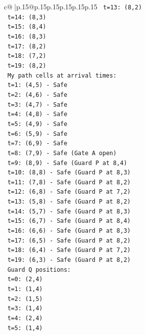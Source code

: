 \documentclass{article}
\begin{document}
{\begin{supertabular}{c@{$\;$}|p{.15\linewidth}@{}p{.15\linewidth}p{.15\linewidth}p{.15\linewidth}p{.15\linewidth}p{.15\linewidth}}
{{{\texttt{   t=13: (8,2)} \\
\texttt{   t=14: (8,3)} \\
\texttt{   t=15: (8,4)} \\
\texttt{   t=16: (8,3)} \\
\texttt{   t=17: (8,2)} \\
\texttt{   t=18: (7,2)} \\
\texttt{   t=19: (8,2)} \\
\texttt{   My path cells at arrival times:} \\
\texttt{   t=1: (4,5) {-} Safe} \\
\texttt{   t=2: (4,6) {-} Safe} \\
\texttt{   t=3: (4,7) {-} Safe} \\
\texttt{   t=4: (4,8) {-} Safe} \\
\texttt{   t=5: (4,9) {-} Safe} \\
\texttt{   t=6: (5,9) {-} Safe} \\
\texttt{   t=7: (6,9) {-} Safe} \\
\texttt{   t=8: (7,9) {-} Safe (Gate A open)} \\
\texttt{   t=9: (8,9) {-} Safe (Guard P at 8,4)} \\
\texttt{   t=10: (8,8) {-} Safe (Guard P at 8,3)} \\
\texttt{   t=11: (7,8) {-} Safe (Guard P at 8,2)} \\
\texttt{   t=12: (6,8) {-} Safe (Guard P at 7,2)} \\
\texttt{   t=13: (5,8) {-} Safe (Guard P at 8,2)} \\
\texttt{   t=14: (5,7) {-} Safe (Guard P at 8,3)} \\
\texttt{   t=15: (6,7) {-} Safe (Guard P at 8,4)} \\
\texttt{   t=16: (6,6) {-} Safe (Guard P at 8,3)} \\
\texttt{   t=17: (6,5) {-} Safe (Guard P at 8,2)} \\
\texttt{   t=18: (6,4) {-} Safe (Guard P at 7,2)} \\
\texttt{   t=19: (6,3) {-} Safe (Guard P at 8,2)} \\
\texttt{   Guard Q positions:} \\
\texttt{   t=0: (2,4)} \\
\texttt{   t=1: (1,4)} \\
\texttt{   t=2: (1,5)} \\
\texttt{   t=3: (1,4)} \\
\texttt{   t=4: (2,4)} \\
\texttt{   t=5: (1,4)} \\
}}}
\end{supertabular}}
\end{document}
